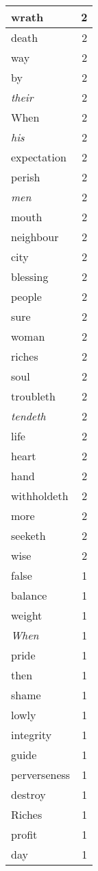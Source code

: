 \begin{center}
\begin{longtable}{l|r}
wrath & 2\\ \hline 
death & 2\\ \hline 
way & 2\\ \hline 
by & 2\\ \hline 
\emph{their} & 2\\ \hline 
When & 2\\ \hline 
\emph{his} & 2\\ \hline 
expectation & 2\\ \hline 
perish & 2\\ \hline 
\emph{men} & 2\\ \hline 
mouth & 2\\ \hline 
neighbour & 2\\ \hline 
city & 2\\ \hline 
blessing & 2\\ \hline 
people & 2\\ \hline 
sure & 2\\ \hline 
woman & 2\\ \hline 
riches & 2\\ \hline 
soul & 2\\ \hline 
troubleth & 2\\ \hline 
\emph{tendeth} & 2\\ \hline 
life & 2\\ \hline 
heart & 2\\ \hline 
hand & 2\\ \hline 
withholdeth & 2\\ \hline 
more & 2\\ \hline 
seeketh & 2\\ \hline 
wise & 2\\ \hline 
false & 1\\ \hline 
balance & 1\\ \hline 
weight & 1\\ \hline 
\emph{When} & 1\\ \hline 
pride & 1\\ \hline 
then & 1\\ \hline 
shame & 1\\ \hline 
lowly & 1\\ \hline 
integrity & 1\\ \hline 
guide & 1\\ \hline 
perverseness & 1\\ \hline 
destroy & 1\\ \hline 
Riches & 1\\ \hline 
profit & 1\\ \hline 
day & 1\\ \hline 

\end{longtable}
\end{center}
